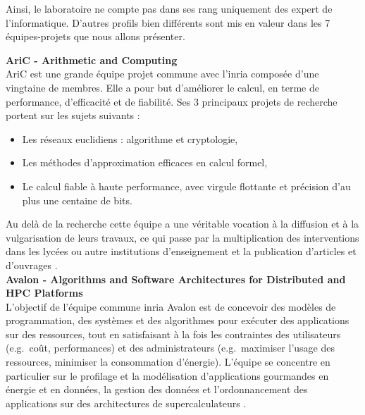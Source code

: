 Ainsi, le laboratoire ne compte pas dans ses rang uniquement des expert de l'informatique. D'autres profils bien différents sont mis en valeur dans les 7 équipes-projets que nous allons présenter.
\newpage

\textbf{AriC - Arithmetic and Computing}\\
AriC est une grande équipe projet commune avec l'\gls{inria} composée d'une vingtaine de membres. Elle a pour but d'améliorer le calcul, en terme de performance, d'efficacité et de fiabilité. Ses 3 principaux projets de recherche portent sur les sujets suivants :
\begin{itemize}
	\item Les réseaux euclidiens : algorithme et cryptologie,
	\item Les méthodes d'approximation efficaces en calcul formel,
	\item Le calcul fiable à haute performance, avec virgule flottante et précision d'au plus une centaine de bits.
\end{itemize}
Au delà de la recherche cette équipe a une véritable vocation à la diffusion et à la vulgarisation de leurs travaux, ce qui passe par la multiplication des interventions dans les lycées ou autre institutions d'enseignement et la publication d'articles et d'ouvrages \cite{aric}.\\

\textbf{Avalon - Algorithms and Software Architectures for Distributed and HPC Platforms}\\
L'objectif de l'équipe commune \gls{inria} Avalon est de concevoir des modèles de programmation, des systèmes et des algorithmes pour exécuter des applications sur des ressources, tout en satisfaisant à la fois les contraintes des utilisateurs (e.g.\ coût, performances) et des administrateurs (e.g.\ maximiser l'usage des ressources, minimiser la consommation d'énergie).
L'équipe se concentre en particulier sur le profilage et la modélisation d'applications gourmandes en énergie et en données, la gestion des données et l'ordonnancement des applications sur des architectures de supercalculateurs \cite{avalon}.\\

